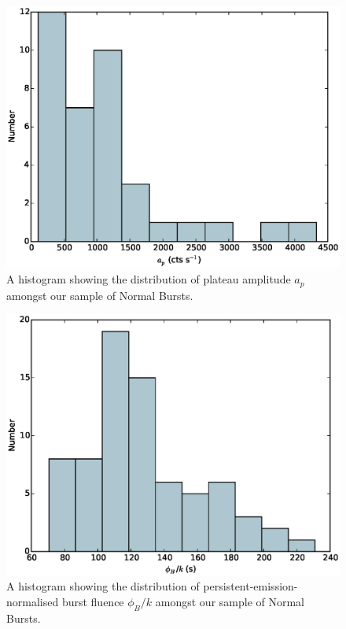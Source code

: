 \begin{figure}
  \centering
  \includegraphics[width=.9\linewidth, trim={0cm 0 0cm 0},clip]{images/appendix_plat_pa_hist.eps}
  \caption[Histogram showing the distribution of $a_p$ amongst Normal Bursts.]{A histogram showing the distribution of plateau amplitude $a_p$ amongst our sample of Normal Bursts.}
  \label{fig:app_hist_ap}
\end{figure}


\begin{figure}
  \centering
  \includegraphics[width=.9\linewidth, trim={0cm 0 0cm 0},clip]{images/appendix_burst_aafluence_n_hist.eps}
  \caption[Histogram showing the distribution of $\phi_B/k$ amongst Normal Bursts.]{A histogram showing the distribution of persistent-emission-normalised burst fluence $\phi_B/k$ amongst our sample of Normal Bursts.}
  \label{fig:app_hist_phib_n}
\end{figure}


